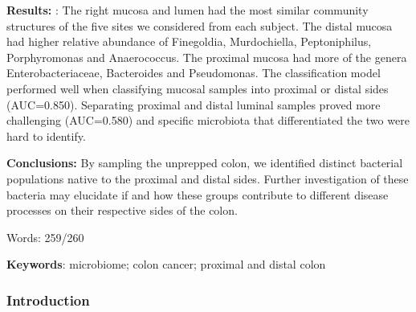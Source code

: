 \documentclass[12pt,]{article}
\begin{document}
\textbf{Results:} : The right mucosa and lumen had the most similar
community structures of the five sites we considered from each subject.
The distal mucosa had higher relative abundance of Finegoldia,
Murdochiella, Peptoniphilus, Porphyromonas and Anaerococcus. The
proximal mucosa had more of the genera Enterobacteriaceae, Bacteroides
and Pseudomonas. The classification model performed well when
classifying mucosal samples into proximal or distal sides (AUC=0.850).
Separating proximal and distal luminal samples proved more challenging
(AUC=0.580) and specific microbiota that differentiated the two were
hard to identify.

\textbf{Conclusions:} By sampling the unprepped colon, we identified
distinct bacterial populations native to the proximal and distal sides.
Further investigation of these bacteria may elucidate if and how these
groups contribute to different disease processes on their respective
sides of the colon.

Words: 259/260

\textbf{Keywords}: microbiome; colon cancer; proximal and distal colon

\subsubsection{Introduction}\label{introduction}
\end{document}
